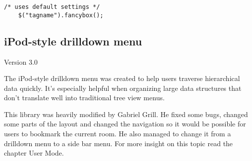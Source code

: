 \begin{lstlisting}[caption=how to fancybox,label=lst:plugin:fancybox]
    /* uses default settings */
    $("tagname").fancybox();
\end{lstlisting}


\subsection{iPod-style drilldown menu}
    Version  3.0

The iPod-style drilldown menu was created to help users traverse hierarchical data quickly. It's especially helpful when organizing large data structures that don't translate well into traditional tree view menus.

This library was heavily modified by Gabriel Grill. He fixed some bugs, changed some parts of the layout and changed the navigation so it would be possible for users to bookmark the current room. He also managed to change it from a drilldown menu to a side bar menu. For more insight on this topic read the chapter User Mode.